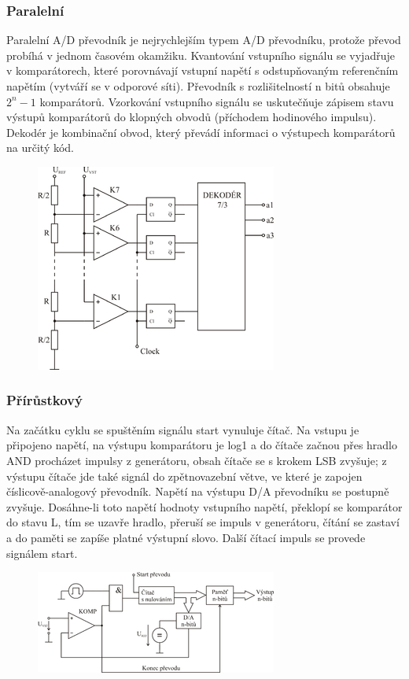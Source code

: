 \subsubsection{Paralelní}
Paralelní A/D převodník je nejrychlejším typem A/D převodníku, protože převod probíhá v jednom časovém okamžiku. Kvantování vstupního signálu se vyjadřuje v komparátorech, které porovnávají vstupní napětí s odstupňovaným referenčním napětím (vytváří se v odporové síti). Převodník s rozlišitelností n bitů obsahuje $2^n-1$ komparátorů. Vzorkování vstupního signálu se uskutečňuje zápisem stavu výstupů komparátorů do klopných obvodů (příchodem hodinového impulsu). Dekodér je kombinační obvod, který převádí informaci o výstupech komparátorů na určitý kód.
\begin{figure}[htbp]
\centering
\includegraphics[scale=3]{sections/5_ad_prevodiky/images/300px-Komparacni_AD_prevodnik.png}
\end{figure}
\subsubsection{Přírůstkový}
Na začátku cyklu se spuštěním signálu start vynuluje čítač. Na vstupu je připojeno napětí, na výstupu komparátoru je log1 a do čítače začnou přes hradlo AND procházet impulsy z generátoru, obsah čítače se s krokem LSB zvyšuje; z výstupu čítače jde také signál do zpětnovazební větve, ve které je zapojen číslicově-analogový převodník. Napětí na výstupu D/A převodníku se postupně zvyšuje. Dosáhne-li toto napětí hodnoty vstupního napětí, překlopí se komparátor do stavu L, tím se uzavře hradlo, přeruší se impuls v generátoru, čítání se zastaví a do paměti se zapíše platné výstupní slovo. Další čítací impuls se provede signálem start.
\begin{figure}[htbp]
\centering
\includegraphics[scale=3]{sections/5_ad_prevodiky/images/300px-Kompenzacni_citaci_AD.png}
\end{figure}
